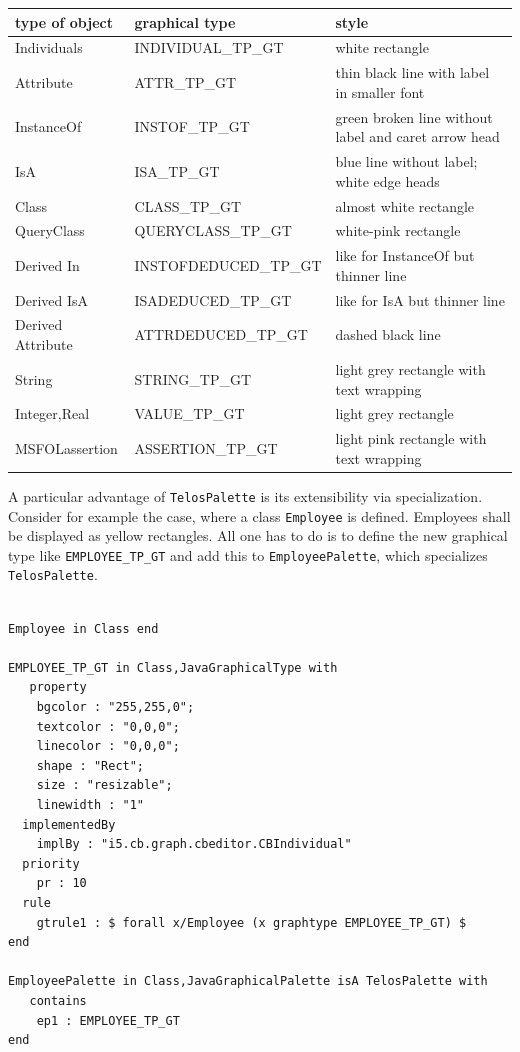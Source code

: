 \begin{center}
\begin{tabular}{|l|l|l|} \hline
{\bf type of object} & {\bf graphical type} & {\bf style} \\ \hline \hline
Individuals & INDIVIDUAL\_TP\_GT & white rectangle \\ \hline
Attribute & ATTR\_TP\_GT & thin black line with label in smaller font\\ \hline
InstanceOf & INSTOF\_TP\_GT & green broken line without label and caret arrow head \\ \hline
IsA & ISA\_TP\_GT & blue line without label; white edge heads \\ \hline
Class & CLASS\_TP\_GT & almost white rectangle\\ \hline
QueryClass & QUERYCLASS\_TP\_GT & white-pink rectangle\\ \hline
Derived In & INSTOFDEDUCED\_TP\_GT & like for InstanceOf but thinner line \\ \hline
Derived IsA & ISADEDUCED\_TP\_GT & like for IsA but thinner line\\ \hline
Derived Attribute & ATTRDEDUCED\_TP\_GT & dashed black line\\ \hline
String & STRING\_TP\_GT & light grey rectangle with text wrapping \\ \hline
Integer,Real & VALUE\_TP\_GT & light grey rectangle \\ \hline
MSFOLassertion & ASSERTION\_TP\_GT & light pink rectangle with text wrapping\\ \hline
\end{tabular}
\end{center}

A particular advantage of {\tt TelosPalette} is its extensibility via specialization. Consider for
example the case, where a class  {\tt Employee} is defined. Employees shall be displayed as
yellow rectangles. All one has to do is to define the new graphical type like {\tt EMPLOYEE\_TP\_GT}
and add this to {\tt EmployeePalette}, which specializes {\tt TelosPalette}.


{\small
\begin{verbatim}

Employee in Class end

EMPLOYEE_TP_GT in Class,JavaGraphicalType with 
   property
    bgcolor : "255,255,0";
    textcolor : "0,0,0";
    linecolor : "0,0,0";
    shape : "Rect";
    size : "resizable";
    linewidth : "1"
  implementedBy
    implBy : "i5.cb.graph.cbeditor.CBIndividual"
  priority
    pr : 10
  rule
    gtrule1 : $ forall x/Employee (x graphtype EMPLOYEE_TP_GT) $
end 

EmployeePalette in Class,JavaGraphicalPalette isA TelosPalette with 
   contains
    ep1 : EMPLOYEE_TP_GT
end 
\end{verbatim}
}

